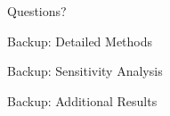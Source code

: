 \documentclass[aspectratio=169,11pt]{beamer}
\begin{document}
\begin{frame}[standout]
  Questions?
\end{frame}

\appendix

\begin{frame}{Backup: Detailed Methods}
\end{frame}

\begin{frame}{Backup: Sensitivity Analysis}
\end{frame}

\begin{frame}{Backup: Additional Results}
\end{frame}
\end{document}
